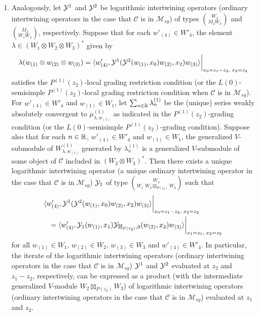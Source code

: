 \documentclass[12pt]{article}
\begin{document}
\begin{corol}
\begin{enumerate}
\item Analogously, let $\mathcal{Y}^1$ and $\mathcal{Y}^2$ be logarithmic intertwining
operators (ordinary intertwining operators in the 
case that $\mathcal{C}$ is in $\mathcal{M}_{sg}$) 
of types ${W_4}\choose {M_2W_3}$ and ${M_2}\choose
{W_1W_2}$, respectively. Suppose that for each $w'_{(4)}\in W'_{4}$,
the element $\lambda\in (W_{1}\otimes W_{2}\otimes W_{3})^{*}$ given
by
\[
\lambda(w_{(1)}\otimes w_{(2)}\otimes w_{(3)})
=\langle w'_{(4)}, \mathcal{Y}^{1}(\mathcal{Y}^2(w_{(1)}, x_{0})w_{(2)}, x_{2})w_{(3)}\rangle
\bigg\vert_{x_{0}=z_{1}-z_{2},\;x_{2}=z_{2}}
\]
satisfies the $P^{(1)}(z_2)$-local
grading restriction condition (or the $L(0)$-semisimple
$P^{(1)}(z_2)$-local grading restriction condition when $\mathcal{C}$
is in $\mathcal{M}_{sg}$). For $w'_{(4)}\in W'_{4}$ and $w_{(1)}\in
W_{1}$, let $\sum_{n\in \mathbb{R}}\lambda_{n}^{(1)}$ be the (unique) series
weakly absolutely convergent to $\mu^{(1)}_{\lambda, w_{(1)}}$ as
indicated in the $P^{(1)}(z_2)$-grading condition (or the
$L(0)$-semisimple $P^{(1)}(z_2)$-grading condition).  Suppose also
that for each $n \in \mathbb{R}$, $w'_{(4)} \in W'_4$ and $w_{(1)} \in W_1$,
the generalized $V$-submodule of $W^{(1)}_{\lambda, w_{(1)}}$
generated by $\lambda_{n}^{(1)}$ is a generalized $V$-submodule of
some object of $\mathcal{C}$ included in $(W_2 \otimes W_3)^*$.  Then
there exists a unique logarithmic intertwining operator (a unique
ordinary intertwining operator in the case that $\mathcal{C}$ is in
$\mathcal{M}_{sg}$) $\mathcal{Y}_{1}$ of type ${W_4\choose
W_1\,\,W_2\boxtimes_{P(z_2)} W_3}$ such that
\begin{eqnarray*}
\lefteqn{\langle w'_{(4)}, \Y^1(\Y^2(w_{(1)}, x_{0})w_{(2)}, x_{2})w_{(3)}\rangle
\lbar_{x_{0}=z_{1}-z_{2},\;x_{2}=z_{2}}}\nn
&&=\langle w'_{(4)}, \Y_{1}(w_{(1)}, x_{1})\Y_{\boxtimes_{P(z_2)}, 0}(w_{(2)}, x_{2})w_{(3)}
\rangle\lbar_{x_{1}=z_{1},\;x_{2}=z_{2}}
\end{eqnarray*}
for all
$w_{(1)}\in W_1$, $w_{(2)}\in W_2$, $w_{(3)}\in W_3$ and $w'_{(4)}\in
W'_4$.  In particular, the iterate of the logarithmic intertwining
operators (ordinary intertwining operators in the case that
$\mathcal{C}$ is in $\mathcal{M}_{sg}$) $\mathcal{Y}^{1}$ and $\mathcal{Y}^{2}$
evaluated at $z_{2}$ and $z_{1}-z_{2}$, respectively, can be expressed as a
product (with the intermediate generalized $V$-module
$W_2\boxtimes_{P(z_2)} W_3$) of logarithmic intertwining operators
(ordinary intertwining operators in the case that $\mathcal{C}$ is in
$\mathcal{M}_{sg}$) evaluated at $z_{1}$ and $z_{2}$.

\end{enumerate}
\end{corol}
\end{document}
